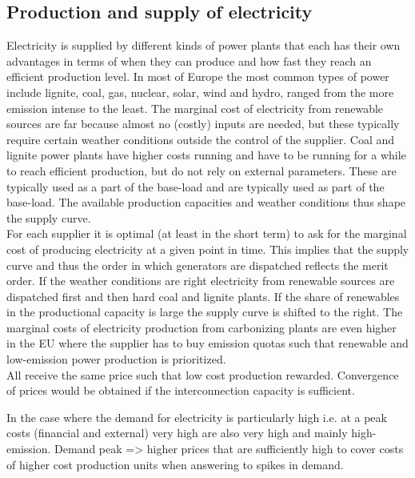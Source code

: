\subsection{Production and supply of electricity}
\label{subsec:t_production}
Electricity is supplied by different kinds of power plants that each has their own advantages in terms of when they can produce and how fast they reach an efficient production level. In most of Europe the most common types of power include lignite, coal, gas, nuclear, solar, wind and hydro, ranged from the more emission intense to the least. The marginal cost of electricity from renewable sources are far because almost no (costly) inputs are needed, but these typically require certain weather conditions outside the control of the supplier. Coal and lignite power plants have higher costs running and have to be running for a while to reach efficient production, but do not rely on external parameters. These are typically used as a part of the base-load  and are typically used as part of the base-load. The available production capacities and weather conditions thus shape the supply curve. \smallskip \\

For each supplier it is optimal (at least in the short term) to ask for the marginal cost of producing electricity at a given point in time. This implies that the supply curve and thus the order in which generators are dispatched reflects the merit order. If the weather conditions are right electricity from renewable sources are dispatched first and then hard coal and lignite plants. If the share of renewables in the productional capacity is large the supply curve is shifted to the right. The marginal costs of electricity production from carbonizing plants are even higher in the EU where the supplier has to buy emission quotas such that renewable and low-emission power production is prioritized. \smallskip \\

All receive the same price such that low cost production rewarded. Convergence of prices would be obtained if the interconnection capacity is sufficient.

In the case where the demand for electricity is particularly high i.e. at a peak costs (financial and external) very high are also very high and mainly high-emission. Demand peak => higher prices that are sufficiently high to cover costs of higher cost production units
when answering to spikes in demand.


